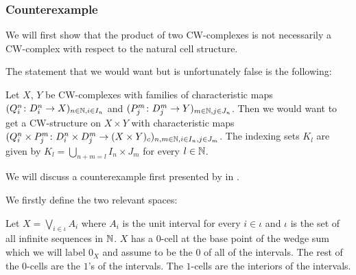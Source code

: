 \subsubsection{Counterexample}

We will first show that the product of two CW-complexes is not necessarily a CW-complex with respect to the natural cell structure.

\begin{rem} \label{rem:wrongproduct}
    The statement that we would want but is unfortunately false is the following: 

    Let $X$, $Y$ be CW-complexes with families of characteristic maps $(Q_i^n \colon D_i^n \to X)_{n \in \mathbb{N}, i \in I_n}$ and $(P_j^m \colon D_j^m \to Y)_{m \in \mathbb{N}, j \in J_n}$. 
    Then we would want to get a CW-structure on $X \times Y$ with characteristic maps $(Q_i^n \times P_j^m \colon D_i^n \times D_j^m \to (X \times Y)_c)_{n,m \in \mathbb{N},i \in I_n,j \in J_m}$.
    The indexing sets $K_l$ are given by $K_l = \bigcup_{n + m = l}I_n \times J_m$ for every $l \in \mathbb{N}$.
\end{rem}

We will discuss a counterexample first presented by  in \cite{Dowker1952}. 

We firstly define the two relevant spaces: 

\begin{defi}
    Let $X = \bigvee_{i \in \iota} A_i$ where $A_i$ is the unit interval for every $i \in \iota$ and $\iota$ is the set of all infinite sequences in $\mathbb{N}$. 
    $X$ has a $0$-cell at the base point of the wedge sum which we will label $0_X$ and assume to be the $0$ of all of the intervals. The rest of the $0$-cells are the $1$'s of the intervals. 
    The $1$-cells are the interiors of the intervals. 
\end{defi}

